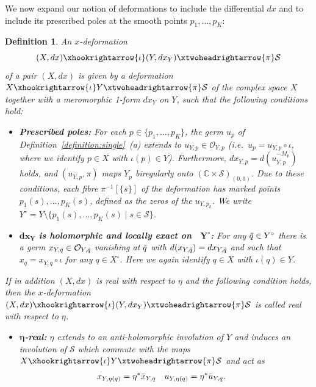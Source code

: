 \documentclass[11pt,twoside]{amsart}
\theoremstyle{plain}
\newtheorem{definition}[theorem]{Definition}
\newcommand{\Sm}{\mathcal{S}}
\newcommand{\Sh}[1]{\mathcal{#1}} %
\newcommand{\dfx}{dx}
\begin{document}
We now expand our notion of deformations to include the differential $\dfx$ and to include its prescribed poles at the smooth points $p_1,\ldots,p_K$:
\begin{definition}\label{def2}
An \emph{$x$-deformation} \begin{equation}\label{eq:deformation 1}
(X,\dfx)\xhookrightarrow{\iota}(Y,\dfx_Y)\xtwoheadrightarrow{\pi}\Sm
\end{equation}
of a pair $(X,\dfx) $ is given by a deformation $ X\xhookrightarrow{\iota}Y\xtwoheadrightarrow{\pi}\Sm $ of the complex space $X$ together with a meromorphic 1-form $\dfx_Y$ on $Y$, such that the following conditions hold:
\begin{itemize}
\item[{\bf(a)}]{\bf Prescribed poles:}
For each $p\in\{p_1,\ldots,p_K\}$, the germ $u_p$ of Definition~\ref{definition:single}~(a)   extends to $u_{Y,p}\in\Sh{O}_{Y,p}$ (i.e.~$u_p=u_{Y,p}\circ\iota$, where we identify $p\in X$ with $\iota(p)\in Y$).  Furthermore, $\dfx_{Y,p}=d(u_{Y,p}^{-M_p})$ holds, and $(u_{Y,p},\pi)$ maps $Y_p$ biregularly onto $(\mathbb{C}\times\Sm)_{(0,0)}$. Due to these conditions, each fibre $\pi^{-1}[\{s\}]$ of the deformation has marked points $p_1(s),\ldots,p_K(s)$, defined as the zeros of the $u_{Y,p_k}$. We write $Y^\circ=Y\setminus\{p_1(s),\ldots,p_K(s)\mid s\in\Sm\}$.
\item[{\bf(b)}] $\mathbf{\dfx_Y}$ {\bf is holomorphic and locally exact on \ }$\mathbf{Y^\circ}${\bf:} For any $\Tilde{q}\in Y^\circ$ there is a germ $x_{Y,\Tilde{q}}\in\Sh{O}_{Y,\Tilde{q}}$ vanishing at $\Tilde{q}$ with $d(x_{Y,\Tilde{q}})=\dfx_{Y,\Tilde{q}}$ and such that $x_q=x_{Y,q}\circ\iota$ for any $q\in X^\circ$.
Here we again identify $q\in X$ with $\iota(q) \in Y$.
\end{itemize}
If in addition $(X,dx)$ is real with respect to $\eta$ and the following condition holds, then the $x$-deformation $(X,\dfx)\xhookrightarrow{\iota}(Y,\dfx_Y)\xtwoheadrightarrow{\pi}\Sm$ is called \emph{real with respect to $\eta$}. 
\begin{itemize}
\item[{\bf(c)}] {\bf $ {\boldsymbol{\eta}} $-real:} $\eta$ extends to an anti-holomorphic involution of $Y$ and induces an involution of $\Sm$ which commute with the maps $X\xhookrightarrow{\iota}Y\xtwoheadrightarrow{\pi}\Sm$ and act as
\begin{gather}\begin{aligned}\label{eq:real2}
x_{Y,\eta(q)}&=\eta^\ast\Bar{x}_{Y,q}&u_{Y,\eta(q)}&=\eta^\ast\Bar{u}_{Y,q}.
\end{aligned}\end{gather}
\end {itemize}
\end{definition}
\end{document}
